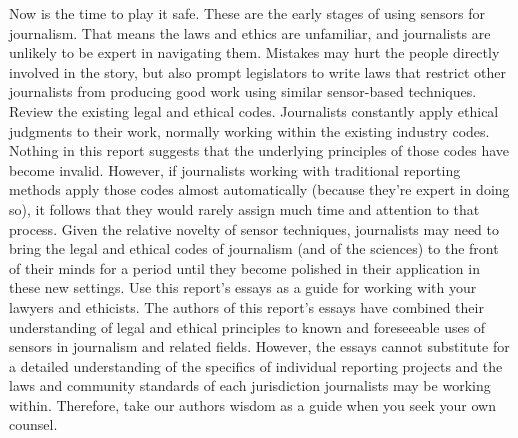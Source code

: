 Now is the time to play it safe.
These are the early stages of using sensors for journalism. That means the
laws and ethics are unfamiliar, and journalists are unlikely to be expert in
navigating them. Mistakes may hurt the people directly involved in the
story, but also prompt legislators to write laws that restrict other journalists
from producing good work using similar sensor-based techniques.
Review the existing legal and ethical codes.
Journalists constantly apply ethical judgments to their work, normally working
within the existing industry codes. Nothing in this report suggests that
the underlying principles of those codes have become invalid. However, if
journalists working with traditional reporting methods apply those codes
almost automatically (because they're expert in doing so), it follows that
they would rarely assign much time and attention to that process. Given
the relative novelty of sensor techniques, journalists may need to bring the
legal and ethical codes of journalism (and of the sciences) to the front of
their minds for a period until they become polished in their application in
these new settings.
Use this report's essays as a guide for working with your
lawyers and ethicists.
The authors of this report's essays have combined their understanding of
legal and ethical principles to known and foreseeable uses of sensors in
journalism and related fields. However, the essays cannot substitute for a
detailed understanding of the specifics of individual reporting projects and
the laws and community standards of each jurisdiction journalists may be
working within. Therefore, take our authors wisdom as a guide when you
seek your own counsel.


